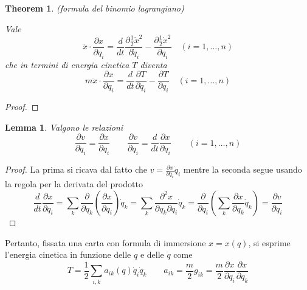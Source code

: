\documentclass{article}
\newtheorem{theorem}{Theorem}[section]
\newtheorem{lemma}{Lemma}[theorem]
\begin{document}
            \begin{theorem}(formula del binomio lagrangiano)
                \label{thm:binomio lagrangiano}

                Vale \[ \ddot{x} \cdot \frac{\partial x}{\partial q_i} = \frac{d}{dt} \frac{\partial \frac{1}{2} \dot{x}^2}{\partial \dot{q}_i} - \frac{\partial \frac{1}{2} \dot{x}^2}{\partial q_i} \quad (i = 1, \dots, n) \]
                che in termini di energia cinetica $T$ diventa \[ m\ddot{x} \cdot \frac{\partial x}{\partial q_i} = \frac{d}{dt} \frac{\partial T}{\partial \dot{q}_i} - \frac{\partial T}{\partial q_i} \quad (i = 1, \dots, n) \] 
                
            \end{theorem}
            \begin{proof}
                
            \end{proof}

            \begin{lemma}
                
                Valgono le relazioni \[ \frac{\partial v}{\partial \dot{q}_i} = \frac{\partial x}{\partial q_i} \quad \quad
                                        \frac{\partial v}{\partial q_i} = \frac{d}{dt} \frac{\partial x}{\partial q_i} \quad \quad (i = 1, \dots, n) \] 

            \end{lemma}
            \begin{proof}
                
                La prima si ricava dal fatto che $v = \frac{\partial x}{\partial q_i} \dot{q}_i$ mentre la seconda segue usando la regola per la derivata del prodotto 
                \[ \frac{d}{dt} \frac{\partial x}{\partial q_i} = \sum_k \frac{\partial}{\partial q_k} (\frac{\partial x}{\partial q_i}) \dot{q}_k 
                                                                = \sum_k \frac{\partial^2 x}{\partial q_k \partial q_i} \dot{q}_k 
                                                                = \frac{\partial}{\partial q_i} (\sum_k \frac{\partial x}{\partial q_k} \dot{q}_k) = \frac{\partial v}{\partial q_i} \]

            \end{proof}
            Pertanto, fissata una carta con formula di immersione $x = x(q)$, si esprime l'energia cinetica in funzione delle $q$ e delle $\dot{q}$ come 
            \[ T = \frac{1}{2} \sum_{i, k} a_{ik}(q) \dot{q}_i \dot{q}_k \quad \quad a_{ik} = \frac{m}{2}g_{ik} = \frac{m}{2} \frac{\partial x}{\partial q_i} \frac{\partial x}{\partial q_k} \]
\end{document}
